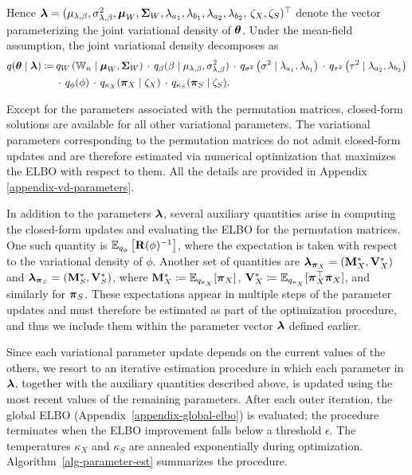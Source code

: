 \documentclass[numsec,webpdf,modern,medium,namedate]{oup-authoring-template}
\theoremstyle{thmstyleone}%
\theoremstyle{thmstyletwo}%
\theoremstyle{thmstylethree}%
\begin{document}
Hence $\boldsymbol{\lambda} = (\mu_{\lambda,\beta},\sigma^2_{\lambda,\beta},\boldsymbol{\mu}_W,\boldsymbol{\Sigma}_W, \lambda_{a_1},\lambda_{b_1},\lambda_{a_2},\lambda_{b_2},\,\zeta_X,\zeta_S)^\top$ 
denote the vector parameterizing the joint variational density of $\boldsymbol{\theta}$. Under the mean-field assumption, the joint variational density decomposes as
{
\small
\begin{equation}\label{eq:variational-decomposition}
\begin{split}
    q(\boldsymbol{\theta} \mid\boldsymbol{\lambda}) \coloneq &\, q_W\left(\mathbb{W}_n \mid \boldsymbol{\mu}_W, \boldsymbol{\Sigma}_W\right) \, \cdot\,  q_\beta(\beta\mid\mu_{\lambda,\beta},\sigma^2_{\lambda,\beta}) \, \cdot\,  q_{\sigma^2}\left(\sigma^2\mid\lambda_{a_1},\lambda_{b_1}\right)\,\cdot\, q_{\tau^2}\left(\tau^2\mid\lambda_{a_2},\lambda_{b_2}\right) \\
    &   \,\cdot\, q_\phi(\phi)\,\cdot\, q_{\kappa_X}(\boldsymbol{\pi}_X\mid\zeta_X)\,\cdot\, q_{\kappa_S}(\boldsymbol{\pi}_S\mid\zeta_S).
\end{split}
\end{equation}}

Except for the parameters associated with the permutation matrices, closed-form solutions are available for all other variational parameters. The variational parameters corresponding to the permutation matrices do not admit closed-form updates and are therefore estimated via numerical optimization that maximizes the ELBO with respect to them. All the details are provided in Appendix \ref{appendix-vd-parameters}.

In addition to the parameters $\boldsymbol{\lambda}$, several auxiliary quantities arise in computing the closed-form updates and evaluating the ELBO for the permutation matrices. One such quantity is $\mathbb{E}_{q_\phi}\left[\mathbf{R}(\phi)^{-1}\right]$, where the expectation is taken with respect to the variational density of $\phi$. Another set of quantities are 
$\boldsymbol{\lambda}_{\boldsymbol{\pi}_X} = (\mathbf{M}_X^\ast,\mathbf{V}^\ast_X)$ and $\boldsymbol{\lambda}_{\boldsymbol{\pi}_S} = (\mathbf{M}_S^\ast,\mathbf{V}^\ast_S)$, where $\mathbf{M}_X^\ast \coloneq \mathbb{E}_{q_{\kappa_X}}[\boldsymbol{\pi}_X]$, $\mathbf{V}_X^\ast \coloneq \mathbb{E}_{q_{\kappa_X}}[\boldsymbol{\pi}_X^\top \boldsymbol{\pi}_X]$, and similarly for $\boldsymbol{\pi}_S$. These expectations appear in multiple steps of the parameter updates and must therefore be estimated as part of the optimization procedure, and thus we include them within the parameter vector $\boldsymbol{\lambda}$ defined earlier.

Since each variational parameter update depends on the current values of the others, we resort to an iterative estimation procedure in which each parameter in $\boldsymbol{\lambda}$, together with the auxiliary quantities described above, is updated using the most recent values of the remaining parameters. After each outer iteration, the global ELBO (Appendix~\ref{appendix-global-elbo}) is evaluated; the procedure terminates when the ELBO improvement falls below a threshold $\epsilon$. The temperatures $\kappa_X$ and $\kappa_S$ are annealed exponentially during optimization. Algorithm~\ref{alg-parameter-est} summarizes the procedure.
\end{document}
